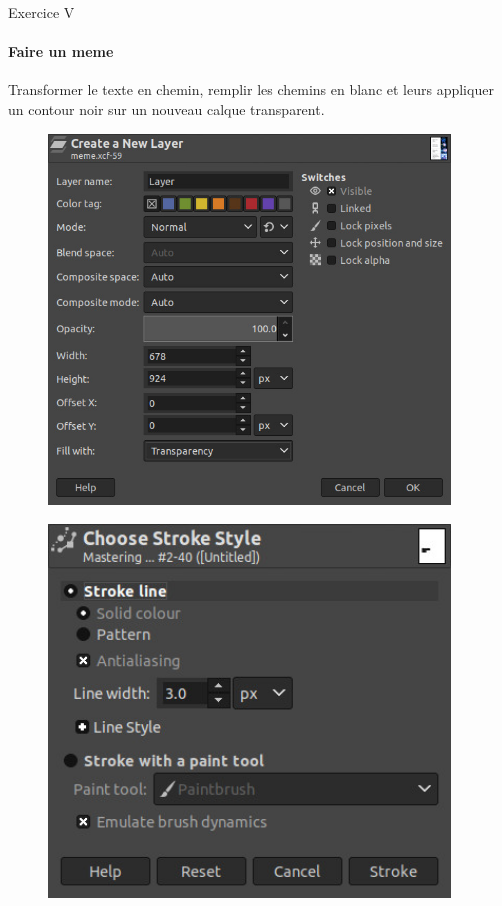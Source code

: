 \documentclass[10pt,svgnames,usenames,table]{beamer}
\begin{document}
\begin{frame}{Exercice V}
\framesubtitle{Faire un meme}
	Transformer le texte en chemin, remplir les chemins en blanc et leurs appliquer un contour noir sur un nouveau calque transparent.
	\hfill
	\begin{minipage}{.50\textwidth}
	\begin{figure}
		\centering
		\includegraphics[width=0.95\textwidth]{Images/text/new_layer}
	\end{figure}
	\end{minipage}\hfill
	\begin{minipage}{0.50\textwidth}
	\begin{figure}
		\centering
		\includegraphics[width=0.95\textwidth]{Images/text/stroke_style}
	\end{figure}
	\end{minipage}	

\end{frame}
\end{document}
